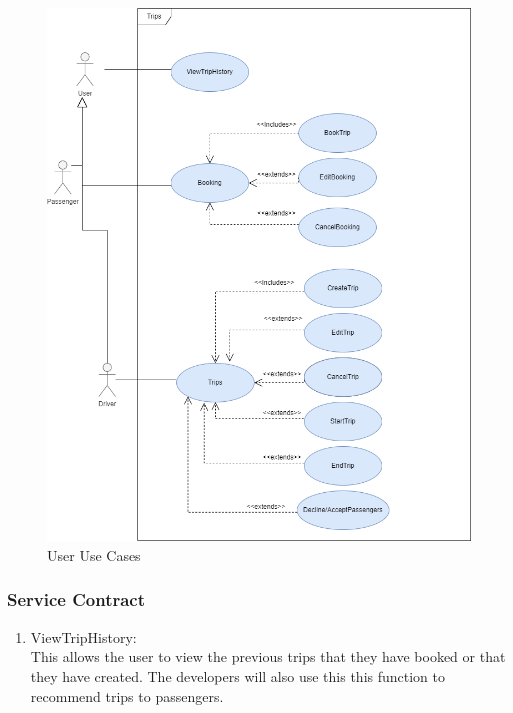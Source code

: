 \documentclass[hidelinks, 12pt, a4paper]{article}
\begin{document}
\begin{enumerate}[label=U1.\arabic*]
                    \begin{figure}[H]
                    
                        \centering
                        \includegraphics[width = 15cm]{images/Trips Usecase.drawio.png}
                        \caption{User Use Cases}
                        \label{fig:User UseCases}
                        
                    \end{figure}
         \newpage           
                \subsubsection{Service Contract}
            
             \begin{enumerate}[label=U1.\arabic*]

                \item ViewTripHistory:\\
                This allows the user to view the previous trips that they have booked or that they have created. The developers will also use this this function to recommend trips to passengers.\\


\end{enumerate}
\end{enumerate}
\end{document}
